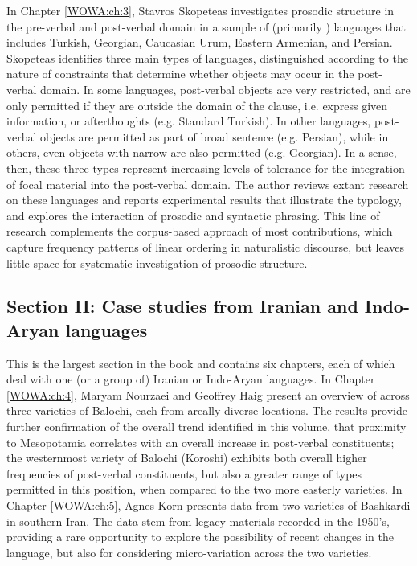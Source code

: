 \documentclass[output=paper,colorlinks,citecolor=brown,collectionchapter]{langscibook}
\begin{document}
In Chapter \ref{WOWA:ch:3}, Stavros Skopeteas investigates prosodic structure in the pre-verbal and post-verbal domain in a sample of (primarily ) languages that includes Turkish, Georgian, Caucasian Urum, Eastern Armenian, and Persian. Skopeteas identifies three main types of  languages, distinguished according to the nature of constraints that determine whether objects may occur in the post-verbal domain. In some languages, post-verbal objects are very restricted, and are only permitted if they are outside the  domain of the clause, i.e. express given information, or afterthoughts (e.g. Standard Turkish). In other languages, post-verbal objects are permitted as part of broad sentence  (e.g. Persian), while in others, even objects with narrow  are also permitted (e.g. Georgian). In a sense, then, these three types represent increasing levels of tolerance for the integration of focal material into the post-verbal domain. The author reviews extant research on these languages and reports experimental results that illustrate the typology, and explores the interaction of prosodic and syntactic phrasing. This line of research complements the corpus-based approach of most contributions, which capture frequency patterns of linear ordering in naturalistic discourse, but leaves little space for systematic investigation of prosodic structure. 

\subsection{Section II: Case studies from Iranian and Indo-Aryan languages}\label{Intro:ss:7.2}

This is the largest section in the book and contains six chapters, each of which deal with one (or a group of) Iranian or Indo-Aryan languages. In Chapter \ref{WOWA:ch:4}, Maryam Nourzaei and Geoffrey Haig present an overview of  across three varieties of Balochi, each from areally diverse locations. The results provide further confirmation of the overall trend identified in this volume, that proximity to Mesopotamia correlates with an overall increase in post-verbal constituents; the westernmost variety of Balochi (Koroshi) exhibits both overall higher frequencies of post-verbal constituents, but also a greater range of  types permitted in this position, when compared to the two more easterly varieties. In Chapter \ref{WOWA:ch:5}, Agnes Korn presents data from two varieties of Bashkardi in southern Iran. The data stem from legacy materials recorded in the 1950's, providing a rare opportunity to explore the possibility of recent changes in the language, but also for considering micro-variation across the two varieties. 
\end{document}
